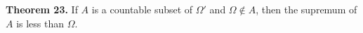 \textbf{Theorem 23.} If $A$ is a countable subset of $\Omega'$ and $\Omega \notin A$, then the supremum of $A$ is less than $\Omega$.
